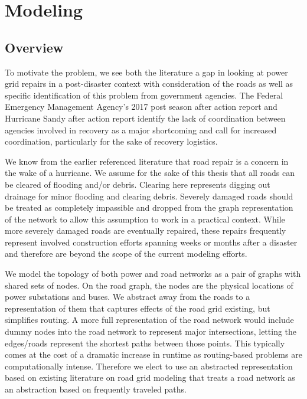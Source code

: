 \chapter{Modeling}
%


\section{Overview}
To motivate the problem, we see both the literature a gap in looking at power grid repairs in a post-disaster context with consideration of the roads as well as specific identification of this problem from government agencies. The Federal Emergency Management Agency's 2017 post season after action report \cite{FEMA2017AAR} and Hurricane Sandy after action report \cite{FEMASandyAAR} identify the lack of coordination between agencies involved in recovery as a major shortcoming and call for increased coordination, particularly for the sake of recovery logistics.

We know from the earlier referenced literature that road repair is a concern in the wake of a hurricane. We assume for the sake of this thesis that all roads can be cleared of flooding and/or debris. Clearing here represents digging out drainage for minor flooding and clearing debris. Severely damaged roads should be treated as completely impassible and dropped from the graph representation of the network to allow this assumption to work in a practical context. While more severely damaged roads are eventually repaired, these repairs frequently represent involved construction efforts spanning weeks or months after a disaster and therefore are beyond the scope of the current modeling efforts.

We model the topology of both power and road networks as a pair of graphs with shared sets of nodes. On the road graph, the nodes are the physical locations of power substations and buses. We abstract away from the roads to a representation of them that captures effects of the road grid existing, but simplifies routing. A more full representation of the road network would include dummy nodes into the road network to represent major intersections, letting the edges/roads represent the shortest paths between those points. This typically comes at the cost of a dramatic increase in runtime as routing-based problems are computationally intense. Therefore we elect to use an abstracted representation based on existing literature on road grid modeling \cite{ChanEA2011} that treats a road network as an abstraction based on frequently traveled paths. 

